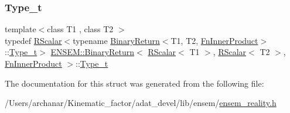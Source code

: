 \mbox{\label{structENSEM_1_1BinaryReturn_3_01RScalar_3_01T1_01_4_00_01RScalar_3_01T2_01_4_00_01FnInnerProduct_01_4_ab67f263abb333e0fd405c675a12d635e}} 
\subsubsection{\texorpdfstring{Type\_t}{Type\_t}\hspace{0.1cm}{\footnotesize\ttfamily [2/2]}}
{\footnotesize\ttfamily template$<$class T1 , class T2 $>$ \\
typedef \mbox{\hyperlink{classENSEM_1_1RScalar}{R\+Scalar}}$<$typename \mbox{\hyperlink{structENSEM_1_1BinaryReturn}{Binary\+Return}}$<$T1, T2, \mbox{\hyperlink{structENSEM_1_1FnInnerProduct}{Fn\+Inner\+Product}}$>$\+::\mbox{\hyperlink{structENSEM_1_1BinaryReturn_3_01RScalar_3_01T1_01_4_00_01RScalar_3_01T2_01_4_00_01FnInnerProduct_01_4_ab67f263abb333e0fd405c675a12d635e}{Type\+\_\+t}}$>$ \mbox{\hyperlink{structENSEM_1_1BinaryReturn}{E\+N\+S\+E\+M\+::\+Binary\+Return}}$<$ \mbox{\hyperlink{classENSEM_1_1RScalar}{R\+Scalar}}$<$ T1 $>$, \mbox{\hyperlink{classENSEM_1_1RScalar}{R\+Scalar}}$<$ T2 $>$, \mbox{\hyperlink{structENSEM_1_1FnInnerProduct}{Fn\+Inner\+Product}} $>$\+::\mbox{\hyperlink{structENSEM_1_1BinaryReturn_3_01RScalar_3_01T1_01_4_00_01RScalar_3_01T2_01_4_00_01FnInnerProduct_01_4_ab67f263abb333e0fd405c675a12d635e}{Type\+\_\+t}}}



The documentation for this struct was generated from the following file\+:\begin{DoxyCompactItemize}
\item 
/\+Users/archanar/\+Kinematic\+\_\+factor/adat\+\_\+devel/lib/ensem/\mbox{\hyperlink{lib_2ensem_2ensem__reality_8h}{ensem\+\_\+reality.\+h}}\end{DoxyCompactItemize}

